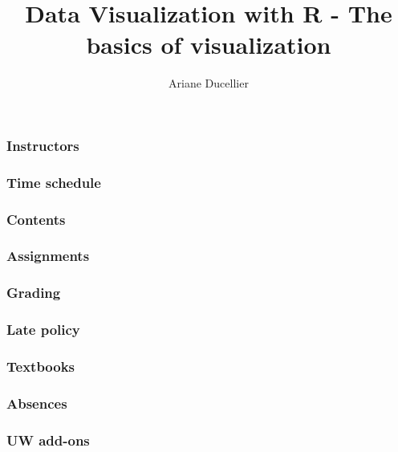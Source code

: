 \documentclass{beamer}
\title[The basics of visualization]{Data Visualization with R - The basics of visualization}
\author{Ariane Ducellier}
\begin{document}
	\begin{frame}
		\titlepage
	\end{frame}

	\begin{frame}
		\frametitle{Instructors}

	\end{frame}

	\begin{frame}
		\frametitle{Time schedule}

	\end{frame}

	\begin{frame}
		\frametitle{Contents}

	\end{frame}

	\begin{frame}
		\frametitle{Assignments}

	\end{frame}

	\begin{frame}
		\frametitle{Grading}

	\end{frame}

	\begin{frame}
		\frametitle{Late policy}

	\end{frame}

	\begin{frame}
		\frametitle{Textbooks}

	\end{frame}

	\begin{frame}
		\frametitle{Absences}

	\end{frame}

	\begin{frame}
		\frametitle{UW add-ons}

	\end{frame}	
\end{document}
